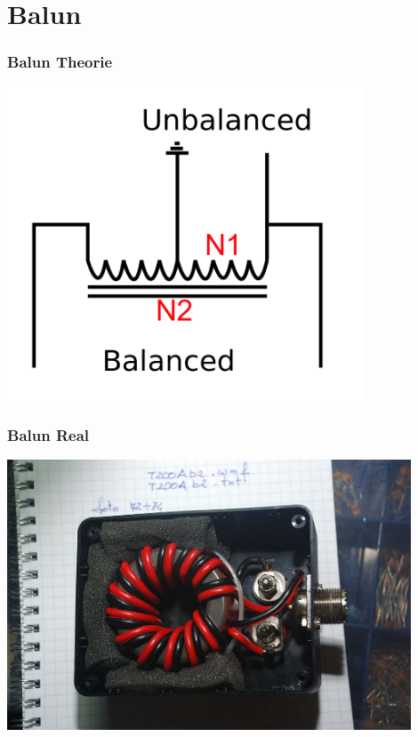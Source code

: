 \section*{Balun}

\begin{frame}
    \frametitle{Balun Theorie}
	\begin{center}
        \includegraphics[width=0.8\textwidth,height=.85\textheight,keepaspectratio]{a03/Cdbalun2.png}
                \tiny \hyperlink{refs}{\cite{wc}}
    \end{center}
\end{frame}

\begin{frame}
    \frametitle{Balun Real}
	\begin{center}
        \includegraphics[width=0.9\textwidth,height=.85\textheight,keepaspectratio]{a03/balun-Real.jpg}
                \tiny \hyperlink{refs}{\cite{wc}}
    \end{center}
\end{frame}


